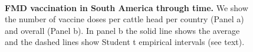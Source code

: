 \documentclass[a4paper,10pt]{article}
\begin{document}
\begin{center}
\begin{figure}[H]
\begin{center}
 \\
\end{center}
\caption{
\textbf{FMD vaccination in South America through time.}
We show the number of vaccine doses per cattle head per country (Panel a) and overall (Panel b).
In panel b the solid line shows the average and the dashed lines show Student t empirical intervals (see text).
}
\label{sfig:vaccination_temporal}
\end{figure}
\end{center}
\end{document}
